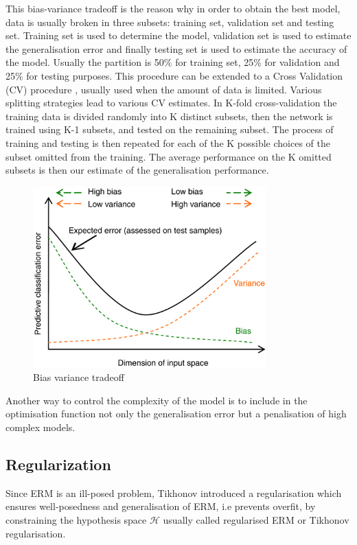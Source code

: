 This bias-variance tradeoff is the reason why in order to obtain the best model, data is usually broken in three subsets: training set, validation set and testing set. Training set is used to determine the model, validation set is used to estimate the generalisation error and finally testing set is used to estimate the accuracy of the model. Usually the partition is 50\% for training set, 25\% for validation and 25\% for testing purposes. This procedure can be extended to a Cross Validation (CV) procedure \cite{geisser1975}, usually used when the amount of data is limited. Various splitting strategies lead to various CV estimates. In K-fold cross-validation the training data is divided randomly into K distinct subsets, then the network is trained using K-1 subsets, and tested on the remaining subset. The process of training and testing is then repeated for each of the K possible choices of the subset omitted from the training. The average performance on the K omitted subsets is then our estimate of the generalisation performance.

\begin{figure}[!h]
  \centering
  \includegraphics[width=0.8\textwidth]{img/biasvariancetradeoff}
  \caption{Bias variance tradeoff}
  \label{fig:bvtradeoff}
\end{figure}

Another way to control the complexity of the model is to include in the optimisation function not only the generalisation error but a penalisation of high complex models. 


\subsection{Regularization}
Since ERM is an ill-posed problem, Tikhonov introduced a regularisation which ensures well-posedness and generalisation of ERM, i.e prevents overfit, by constraining the hypothesis space $\mathcal{H}$ usually called regularised ERM or Tikhonov regularisation.

